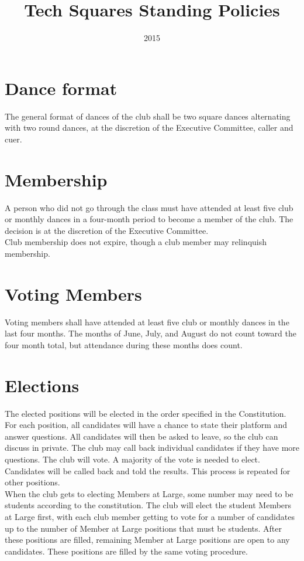 \documentclass{article}
\title{Tech Squares Standing Policies}
\date{2015}
\begin{document}
\maketitle
\section {Dance format}
The general format of dances of the club shall be two square dances alternating with two round dances, at the discretion of the Executive Committee, caller and cuer.
\section {Membership}
A person who did not go through the class must have attended at least five club or monthly dances in a four-month period to become a member of the club. The decision is at the discretion of the Executive Committee. \\
Club membership does not expire, though a club member may relinquish membership.
\section {Voting Members}
Voting members shall have attended at least five club or monthly dances in the last four months. The months of June, July, and August do not count toward the four month total, but attendance during these months does count.
\section{Elections} 
The elected positions will be elected in the order specified in the Constitution. For each position, all candidates will have a chance to state their platform and answer questions. All candidates will then be asked to leave, so the club can discuss in private. The club may call back individual candidates if they have more questions. The club will vote. A majority of the vote is needed to elect. Candidates will be called back and told the results. This process is repeated for other positions. \\
When the club gets to electing Members at Large, some number may need to be students according to the constitution. The club will elect the student Members at Large first, with each club member getting to vote for a number of candidates up to the number of Member at Large positions that must be students. After these positions are filled, remaining Member at Large positions are open to any candidates. These positions are filled by the same voting procedure. 
\end{document}
